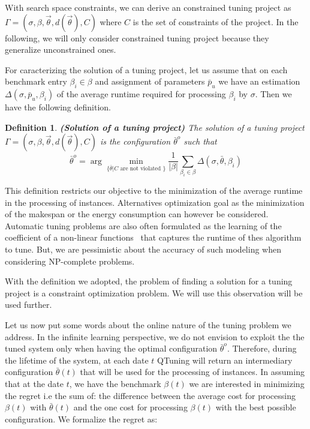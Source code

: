 \documentclass[10pt, conference, compsocconf]{IEEEtran}
\newtheorem{definition}[theorem]{Definition}
\begin{document}
With search space constraints, we can derive an constrained tuning project as $ \Gamma = (\sigma, \beta, \vec{\theta}, d(\vec{\theta}), C)$ 
where $C$ is the set of constraints of the project. In the following, we will only consider constrained tuning project because 
they generalize unconstrained ones. 


For caracterizing the solution of a tuning project, let us assume that on each benchmark entry $\beta_i \in \beta$ 
and assignment of parameters $\bar{p}_u$ we have an estimation $\Delta(\sigma, \bar{p}_u, \beta_i)$ of the 
average runtime required for processing $\beta_i$ by $\sigma$. Then we have the following definition.

\begin{definition}{\bf (Solution of a tuning project)}
The solution of a tuning project $ \Gamma = (\sigma, \beta, \vec{\theta}, d(\vec{\theta}), C)$  is the configuration 
$\bar{\theta}^o$ such that \[ \bar{\theta}^o = \arg \underset{\{\bar{\theta} | C \text{ are not violated }\}}{\min} \frac{1}{|\beta|}\sum_{\beta_i \in \beta} \Delta(\sigma, \bar{\theta}, \beta_i) \] 

\end{definition}

This definition restricts our objective to the minimization of the average runtime in the processing of instances. 
Alternatives optimization goal as the minimization of the makespan or the energy consumption can however be considered. 
Automatic tuning problems are also often formulated as the learning of the coefficient of a non-linear functions~\cite{icl:418} 
that captures the runtime of thes algorithm to tune. But, we are pessimistic about the accuracy of such modeling 
when considering NP-complete problems. 

With the definition we adopted, the problem of finding a solution for a tuning project is a constraint 
optimization problem. We will use this observation will be used further. 

Let us now put some words about the online nature of the tuning problem we address. 
In the infinite learning perspective, we do not envision to exploit the 
the tuned system only when having the optimal configuration $\bar{\theta}^o $. Therefore, during the lifetime of the 
system, at each date $t$ QTuning will return an  intermediary configuration $\bar{\theta}(t)$ that will be used for the processing of instances. 
In assuming that at the date $t$, we have the benchmark $\beta(t)$ we are interested in minimizing the regret i.e the sum of: the difference 
between the average cost for processing $\beta(t)$ with $\bar{\theta}(t)$ and the one cost for processing $\beta(t)$ with the best possible configuration. 
We formalize the regret as: 
\end{document}

